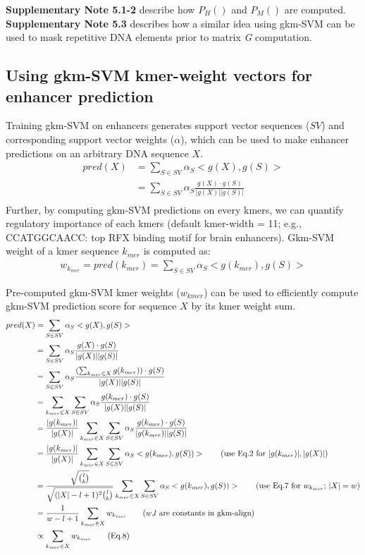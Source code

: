 \documentclass[english]{article}
\begin{document}
\textbf{Supplementary Note 5.1-2} describe how $P_H()$ and $P_M()$ are computed. \textbf{Supplementary Note 5.3} describes how a similar idea using gkm-SVM can be used to mask repetitive DNA elements prior to matrix \textit{G} computation.

 \subsection{Using gkm-SVM kmer-weight vectors for enhancer prediction}
 Training gkm-SVM on enhancers generates support vector sequences ($SV$) and corresponding support vector weights ($\alpha$), which can be used to make enhancer predictions on an arbitrary DNA sequence $X$. 
 \begin{align*}
     pred(X)&=\sum_{S \in SV} \alpha_S <g(X),g(S)> \\  &=\sum_{S \in SV} \alpha_S \frac{g(X)\cdot g(S)}{|g(X)||g(S)|} \\
 \end{align*}
 Further, by computing gkm-SVM predictions on every kmers, we can quantify regulatory importance of each kmers (default kmer-width = 11; e.g., CCATGGCAACC: top RFX binding motif for brain enhancers). Gkm-SVM weight of a kmer sequence $k_{mer}$ is computed as:
 \begin{align*}
     w_{k_{mer}} = pred(k_{mer}) = \sum_{S \in SV} \alpha_S <g(k_{mer}),g(S)> \tag{Eq.7}
 \end{align*}

Pre-computed gkm-SVM kmer weights ($w_{kmer}$) can be used to efficiently compute gkm-SVM prediction score for sequence $X$ by its kmer weight sum.
 \begin{align*}
     pred(X)&=\sum_{S \in SV} \alpha_S <g(X),g(S)> \\
     &=\sum_{S \in SV} \alpha_S \frac{g(X)\cdot g(S)}{|g(X)||g(S)|} \\
     &=\sum_{S \in SV} \alpha_S \frac{(\sum_{k_{mer} \in X}g(k_{mer}))\cdot g(S)}{|g(X)||g(S)|} \\
     &=\sum_{k_{mer} \in X} \sum_{S \in SV} \alpha_{S}\frac{g(k_{mer})\cdot g(S)}{|g(X)||g(S)|} \\
     &=\frac{|g(k_{mer})|}{|g(X)|}\sum_{k_{mer} \in X} \sum_{S \in SV} \alpha_{S}\frac{g(k_{mer})\cdot g(S)}{|g(k_{mer})||g(S)|} \\
     &=\frac{|g(k_{mer})|}{|g(X)|} \sum_{k_{mer} \in X} \sum_{S \in SV} \alpha_{S}<g(k_{mer}),g(S))> \tag{use Eq.2 for $|g(k_{mer})|, |g(X)|$} \\
     &=\frac{\sqrt{\binom{l}{k}}}{\sqrt{(|X|-l+1)^2\binom{l}{k}}} \sum_{k_{mer} \in X} \sum_{S \in SV} \alpha_{S}<g(k_{mer}),g(S))>  \tag{use Eq.7 for $w_{k_{mer}}$; $|X|=w$}\\
     &=\frac{1}{w-l+1} \sum_{k_{mer}\in X}w_{k_{mer}} \tag{$w$,$l$ are constants in gkm-align}\\
     &\propto \sum_{k_{mer}\in X}w_{k_{mer}} \tag{Eq.8}
 \end{align*}
\end{document}
